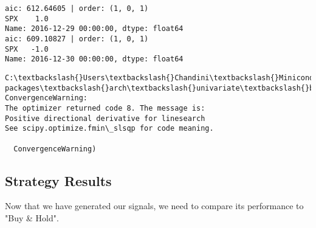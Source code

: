 \documentclass[11pt]{article}
\begin{document}
    \begin{Verbatim}[commandchars=\\\{\}]
aic: 612.64605 | order: (1, 0, 1)
SPX    1.0
Name: 2016-12-29 00:00:00, dtype: float64
aic: 609.10827 | order: (1, 0, 1)
SPX   -1.0
Name: 2016-12-30 00:00:00, dtype: float64

    \end{Verbatim}

    \begin{Verbatim}[commandchars=\\\{\}]
C:\textbackslash{}Users\textbackslash{}Chandini\textbackslash{}Miniconda3\textbackslash{}envs\textbackslash{}auquan\textbackslash{}lib\textbackslash{}site-packages\textbackslash{}arch\textbackslash{}univariate\textbackslash{}base.py:513: ConvergenceWarning: 
The optimizer returned code 8. The message is:
Positive directional derivative for linesearch
See scipy.optimize.fmin\_slsqp for code meaning.

  ConvergenceWarning)

    \end{Verbatim}

    \subsection{Strategy Results}\label{strategy-results}

Now that we have generated our signals, we need to compare its
performance to "Buy \& Hold".
\end{document}
